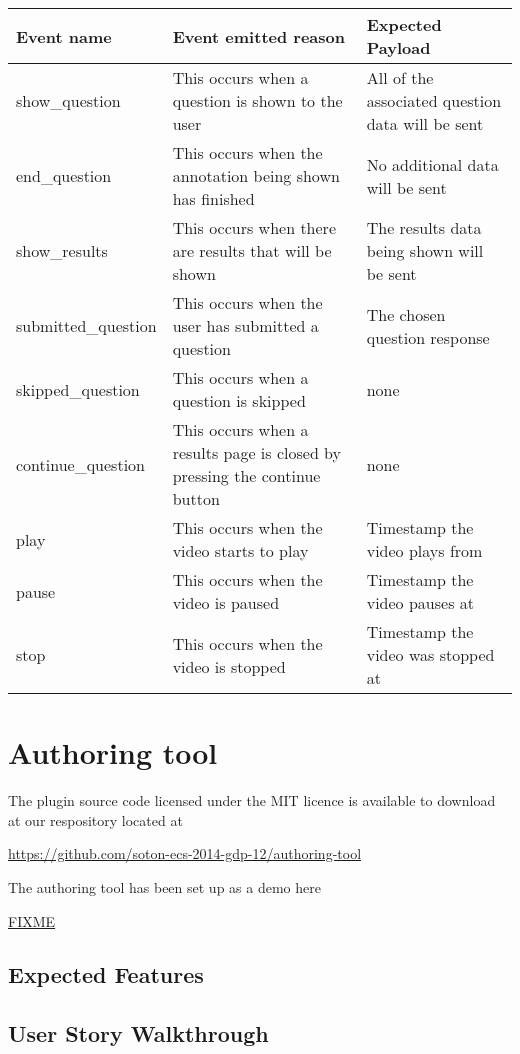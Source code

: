 \documentclass[12pt,a4paper]{article}
\begin{document}
\begin{tabular}{p{3.2cm} p{7cm} p{4cm}}

\textbf{Event name} & \textbf{Event emitted reason} & \textbf{Expected Payload} \\ 
\hline 
show\_question & This occurs when a question is shown to the user & All of the associated question data will be sent \\ 
\hline 
end\_question & This occurs when the annotation being shown has finished & No additional data will be sent \\ 
\hline 
show\_results & This occurs when there are results that will be shown & The results data being shown will be sent \\ 
\hline 
submitted\_question & This occurs when the user has submitted a question & The chosen question response \\ 
\hline 
skipped\_question & This occurs when a question is skipped & none \\ 
\hline 
continue\_question & This occurs when a results page is closed by pressing the continue button & none \\ 
\hline 
play & This occurs when the video starts to play & Timestamp the video plays from \\ 
\hline 
pause & This occurs when the video is paused & Timestamp the video pauses at \\ 
\hline 
stop & This occurs when the video is stopped & Timestamp the video was stopped at \\
\end{tabular} 


\section*{Authoring tool}

The plugin source code licensed under the MIT licence is available to download at our respository located at 

\url{https://github.com/soton-ecs-2014-gdp-12/authoring-tool}

The authoring tool has been set up as a demo here

\url{FIXME}

\subsection*{Expected Features}



\subsection*{User Story Walkthrough}
\end{document}
